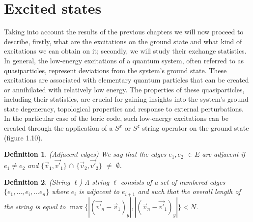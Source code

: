\documentclass{Configuration_Files/PoliMi3i_thesis}
\newtheorem{definition}{Definition}[chapter]
\begin{document}





















\newpage
\section{Excited states}
\label{sec:ES}


Taking into account the results of the previous chapters we will now proceed to describe, firstly, what are the excitations on the ground state and what kind of excitations we can obtain on it; secondly, we will study their exchange statistics. In general, the low-energy excitations of a quantum system, often referred to as quasiparticles, represent deviations from the system's ground state. These excitations are associated with elementary quantum particles that can be created or annihilated with relatively low energy. The properties of these quasiparticles, including their statistics, are crucial for gaining insights into the system's ground state degeneracy, topological properties and response to external perturbations. \newline
In the particular case of the toric code, such low-energy excitations can be created through the application of a $S^x$ or $S^z$ string operator on the ground state (figure 1.10).

\begin{definition}(Adjacent edges)
	We say that the edges  $e_1, e_2$ $\in E$ are adjacent if $e_1\neq e_2$ and $\{ \vec{v}_1, \vec{v'}_1\}$ $\cap $ $\{ \vec{v}_2, \vec{v'}_2\}$ $\neq$ $\emptyset$.
\end{definition}

\begin{definition}(String $\ell$)
	A string $\ell$ consists of a set of numbered edges $\{e_1, \dots, e_i, \dots e_n\}$ where $e_i$ is adjacent to $e_{i+1}$ and such that the overall length of the string is equal to $\max \{ |(\vec{v'}_n-\vec{v}_1)_y|, |(\vec{v}_n-\vec{v'}_1)_y| \} < N$.
\end{definition}
\end{document}
